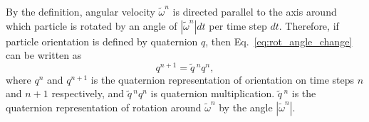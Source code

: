By the definition, angular velocity $\tilde{\omega}^n$ is directed parallel to the axis around which particle is rotated by an angle of $|\tilde{\omega}^n|dt$ per time step $dt$. Therefore, if particle orientation is defined by quaternion $q$, then Eq.~\eqref{eq:rot_angle_change} can be written as
\begin{equation}
q^{n+1} = \tilde{q}\,^n q^{n} ,
\end{equation}
where $q^n$ and $q^{n+1}$ is the quaternion representation of orientation on time steps $n$ and $n+1$ respectively, and $\tilde{q}\,^n q^{n}$ is quaternion multiplication. $\tilde{q}\,^n$ is the quaternion representation of rotation around $\tilde{\omega}^n$ by the angle $|\tilde{\omega}^n|$.